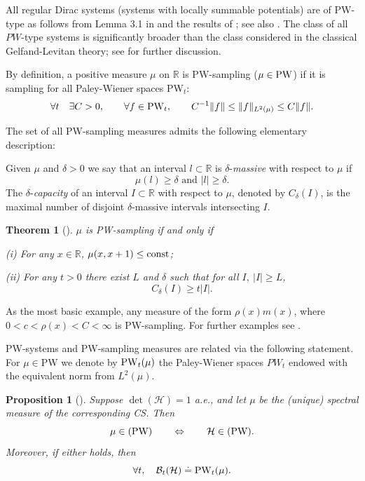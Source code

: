 \documentclass[11pt,twoside,reqno]{amsart}
\def\const{\text{\rm const}}
\def\PW{\text{\rm PW}}
\def\ms{\bigskip}
\def\ms{\medskip}
\def\R{{\mathbb R}}
\def\BB{{\mathcal B}}
\def\HH{{\mathcal H}}
\def\d{\delta}
\def\const{\text{\rm const}}
\theoremstyle{plain}
\newtheorem{theorem}{Theorem}
\newtheorem{proposition}{Proposition}
\numberwithin{equation}{section}
\begin{document}
All regular Dirac systems (systems with locally summable potentials) are of PW-type as follows from Lemma 3.1 in \cite{etudes}
and the results of \cite{LS}; see also \cite{BR}. The class of all $PW$-type systems is significantly broader than the class considered in the classical Gelfand-Levitan theory; see \cite{etudes} for further discussion.

By definition, a positive measure $\mu$ on $\R$ is  PW-sampling  ($\mu\in\PW$) if it is sampling for all Paley-Wiener spaces PW$_t$:
$$\forall t\quad\exists C>0,\qquad \forall f\in {\rm PW}_t, \qquad C^{-1}\|f\|\le \|f\|_{L^2(\mu)}\le C\|f\|.$$

The set of all PW-sampling measures admits the following elementary description:

Given $\mu$ and $\delta>0$ we say that an interval $l\subset\R$ is $\delta$-{\it massive} with respect to $\mu$ if
$$\mu(l)\ge \delta\textrm{ and } |l|\ge\delta.$$
The $\delta$-{\it capacity}   of an interval $I\subset\R$ with respect to $\mu$, denoted by $C_\delta(I)$, is the maximal number of disjoint $\delta$-massive intervals intersecting $I$.


\ms

\begin{theorem}[\cite{etudes}]\label{PWmu} $\mu$ is  PW-sampling if and only if
	
	(i) For any $x\in \R$, $\mu(x,x+1)\le \const$;
	
	(ii) For any $t>0$ there exist $L$ and $\d$ such that for all $I,\ |I|\ge L$,\newline
	$$C_\delta(I)\ge t|I|.$$
\end{theorem}

As the most basic example, any measure of the form $\rho(x)m(x)$, where $0<c<\rho(x)<C<\infty$ is PW-sampling. For further examples see \cite{etudes}.

PW-systems and PW-sampling measures are related via the following statement. For $\mu\in$PW we denote by ${\rm PW}_t(\mu)$ the
Paley-Wiener spaces  $PW_t $ endowed with the equivalent norm from $L^2(\mu)$.

\begin{proposition}
[\cite{etudes}]Suppose $\det(\HH)=1$ a.e., and let $\mu$ be the (unique) spectral measure of the corresponding CS. Then
	$$\mu\in{\rm(PW)}\qquad \Leftrightarrow\qquad \HH\in{\rm(PW)}.$$
	Moreover, if either holds, then
	$$\forall t,\quad \BB_t(\HH)\doteq {\rm PW}_t(\mu).$$\end{proposition}
\end{document}
